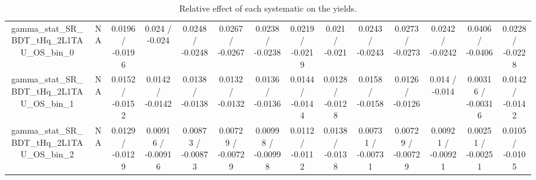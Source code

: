 \documentclass[10pt]{article}
\begin{document}
\begin{table}[htbp]
\begin{center}
\begin{tabular}{|c|c|c|c|c|c|c|c|c|c|c|c|c|c|}
  gamma_stat_SR_BDT_tHq_2L1TAU_OS_bin_0 &    NA    & 0.0196 / -0.0196 & 0.024 / -0.024 & 0.0248 / -0.0248 & 0.0267 / -0.0267 & 0.0238 / -0.0238 & 0.0219 / -0.0219 & 0.021 / -0.021 & 0.0243 / -0.0243 & 0.0273 / -0.0273 & 0.0242 / -0.0242 & 0.0406 / -0.0406 & 0.0228 / -0.0228 \\ 
  gamma_stat_SR_BDT_tHq_2L1TAU_OS_bin_1 &    NA    & 0.0152 / -0.0152 & 0.0142 / -0.0142 & 0.0138 / -0.0138 & 0.0132 / -0.0132 & 0.0136 / -0.0136 & 0.0144 / -0.0144 & 0.0128 / -0.0128 & 0.0158 / -0.0158 & 0.0126 / -0.0126 & 0.014 / -0.014 & 0.00316 / -0.00316 & 0.0142 / -0.0142 \\ 
  gamma_stat_SR_BDT_tHq_2L1TAU_OS_bin_2 &    NA    & 0.0129 / -0.0129 & 0.00916 / -0.00916 & 0.00873 / -0.00873 & 0.00729 / -0.00729 & 0.00998 / -0.00998 & 0.0112 / -0.0112 & 0.0138 / -0.0138 & 0.00731 / -0.00731 & 0.00729 / -0.00729 & 0.00921 / -0.00921 & 0.00251 / -0.00251 & 0.0105 / -0.0105 \\ 
\hline 
\end{tabular} 
\caption{Relative effect of each systematic on the yields.} 
\end{center} 
\end{table} 
\end{document}
